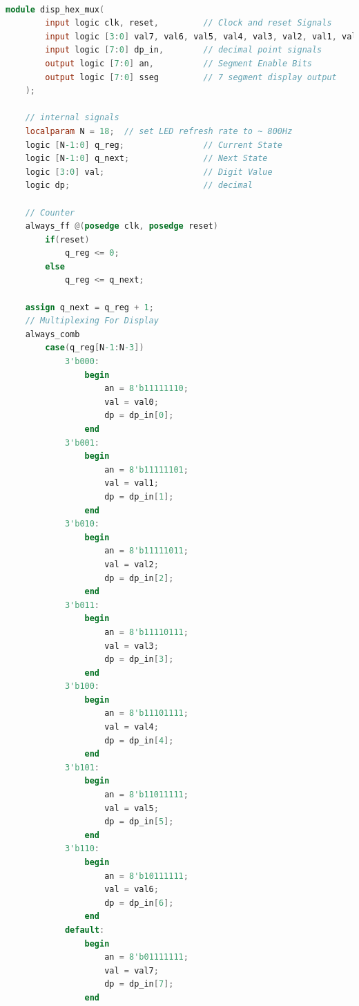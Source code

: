 \documentclass{article}
\begin{document}
\begin{lstlisting}[language = Verilog]

module disp_hex_mux(
        input logic clk, reset,         // Clock and reset Signals
        input logic [3:0] val7, val6, val5, val4, val3, val2, val1, val0,    
        input logic [7:0] dp_in,        // decimal point signals
        output logic [7:0] an,          // Segment Enable Bits
        output logic [7:0] sseg         // 7 segment display output
    );
    
    // internal signals
    localparam N = 18;  // set LED refresh rate to ~ 800Hz
    logic [N-1:0] q_reg;                // Current State
    logic [N-1:0] q_next;               // Next State
    logic [3:0] val;                    // Digit Value
    logic dp;                           // decimal 
    
    // Counter
    always_ff @(posedge clk, posedge reset)
        if(reset)
            q_reg <= 0;
        else
            q_reg <= q_next;
        
    assign q_next = q_reg + 1;
    // Multiplexing For Display    
    always_comb
        case(q_reg[N-1:N-3])
            3'b000:
                begin
                    an = 8'b11111110;
                    val = val0;
                    dp = dp_in[0];
                end
            3'b001:
                begin
                    an = 8'b11111101;
                    val = val1;
                    dp = dp_in[1];
                end
            3'b010:
                begin
                    an = 8'b11111011;
                    val = val2;
                    dp = dp_in[2];
                end
            3'b011:
                begin
                    an = 8'b11110111;
                    val = val3;
                    dp = dp_in[3];
                end
            3'b100:
                begin
                    an = 8'b11101111;
                    val = val4;
                    dp = dp_in[4];
                end
            3'b101:
                begin
                    an = 8'b11011111;
                    val = val5;
                    dp = dp_in[5];
                end
            3'b110:
                begin
                    an = 8'b10111111;
                    val = val6;
                    dp = dp_in[6];
                end
            default:
                begin
                    an = 8'b01111111;
                    val = val7;
                    dp = dp_in[7];
                end
                    

\end{lstlisting}
\end{document}
